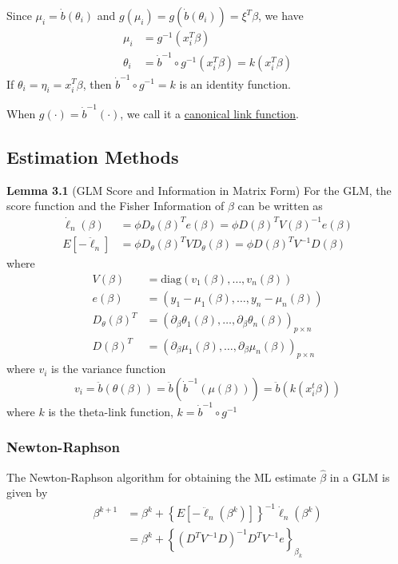 \documentclass[12pt]{article}
\newcommand{\diag}{\text{diag}}
\numberwithin{equation}{section}
\begin{document}
Since $\mu_i = \dot{b}(\theta_i)$ and $g(\mu_i) = g(\dot{b}(\theta_i)) = \xi^T \beta$, we have
\begin{align*}
  \mu_i &= g^{-1}(x_i^T \beta) \\
  \theta_i &= \dot{b}^{-1} \circ g^{-1}(x_i^T \beta) = k(x_i^T \beta)
\end{align*}
%
If $\theta_i = \eta_i = x_i^T \beta$, then $\dot{b}^{-1} \circ g^{-1} = k$ is an identity function.

When $g(\cdot) = \dot{b}^{-1}(\cdot)$, we call it a \underline{canonical link function}. 



\subsection{Estimation Methods}
\textbf{Lemma 3.1} (GLM Score and Information in Matrix Form)
For the GLM, the score function and the Fisher Information of $\beta$ can be written as
\begin{align*}
  \dot{\ell}_n (\beta) &= \phi D_{\theta}(\beta)^T e(\beta)
    = \phi D(\beta)^T V(\beta)^{-1} e(\beta) \\
    E[-\ddot{\ell}_n] &= \phi D_{\theta}(\beta)^T V D_{\theta}(\beta)
      = \phi D(\beta)^T V^{-1} D(\beta)
\end{align*}
where
\begin{align*}
  V(\beta) &= \diag(v_1(\beta), \ldots, v_n(\beta)) \\
  e(\beta) &= (y_1 - \mu_1(\beta), \ldots, y_n - \mu_n(\beta)) \\
  D_{\theta}(\beta)^T &= (\partial_\beta \theta_1(\beta), \ldots, \partial_\beta \theta_n(\beta))_{p \times n} \\
  D(\beta)^T &= (\partial_\beta \mu_1(\beta), \ldots, \partial_{\beta} \mu_{n}(\beta))_{p \times n}
\end{align*}
where $v_i$ is the variance function
\begin{equation*}
  v_i = \ddot{b}(\theta(\beta)) = \ddot{b}(\dot{b}^{-1}(\mu(\beta)))
    = \ddot{b}(k(x_i^t \beta))
\end{equation*}
where $k$ is the theta-link function, $k = \dot{b}^{-1} \circ g^{-1}$

\subsubsection{Newton-Raphson}
The Newton-Raphson algorithm for obtaining the ML estimate $\hat{\beta}$ in a GLM is given by
\begin{align*}
  \beta^{k+1} &=
    \beta^{k} + 
    \left\{ E[-\ddot{\ell}_n(\beta^k)] \right\}^{-1} \dot{\ell}_n(\beta^k) \\
    &= \beta^k +
    \left\{ (D^T V^{-1} D)^{-1} D^T V^{-1} e \right\}_{\beta_k}
\end{align*}
\end{document}
